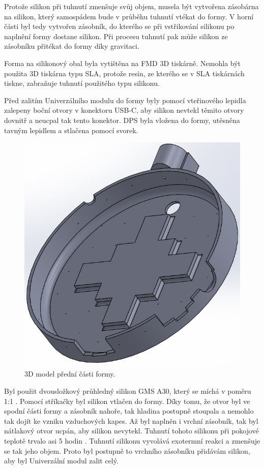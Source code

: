 Protože silikon při tuhnutí zmenšuje svůj objem, musela být vytvořena zásobárna na silikon, který samospádem bude v průběhu tuhnutí vtékat do formy. V horní části byl tedy vytvořen zásobník, do kterého 
se při vstřikování silikonu po naplnění formy dostane silikon. Při procesu tuhnutí pak může silikon ze zásobníku přitékat do formy díky gravitaci. 

Forma na silikonový obal byla vytištěna na FMD 3D tiskárně. Nemohla být použita 3D tiskárna typu SLA, protože resin, ze kterého se v SLA tiskárnách tiskne, zabraňuje tuhnutí použitého typu silikonu. 

Před zalitím Univerzálního modulu do formy byly pomocí vteřinového lepidla zalepeny boční otvory v konektoru USB-C, aby silikon nevtekl těmito otvory dovnitř a neucpal tak tento konektor. DPS byla 
vložena do formy, utěsněna tavným lepidlem a stlačena pomocí svorek.

\begin{figure}[!h]
  \begin{center}
    \includegraphics[scale=0.4]{obrazky/forma_predni.jpg}
  \end{center}
  \caption[3D model přední části formy]{3D model přední části formy.}
\end{figure}

Byl použit dvousložkový průhledný silikon GMS A30, který se míchá v poměru 1:1 \cite{silikon}. Pomocí stříkačky byl silikon vtlačen do formy. Díky tomu, že otvor byl ve spodní části formy a zásobník 
nahoře, tak hladina postupně stoupala a nemohlo tak dojít ke vzniku vzduchových kapes. Až byl naplněn i vrchní zásobník, tak byl nátlakový otvor ucpán, aby silikon nevytekl. Tuhnutí tohoto silikonu 
při pokojové teplotě trvalo asi 5 hodin \cite{silikon}. Tuhnutí silikonu vyvolává exotermní reakci a zmenšuje se tak jeho objem. Proto byl postupně to vrchního zásobníku přidávám silikon, aby byl 
Univerzální modul zalit celý. 

